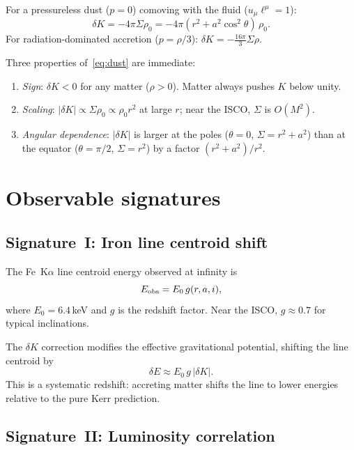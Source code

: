 \documentclass[12pt,a4paper]{article}
\begin{document}
\noindent
For a pressureless dust ($p=0$) comoving with the fluid
($u_\mu\ell^\mu=1$):
\begin{equation}\label{eq:dust}
  \delta K = -4\pi\Sigma\rho_0 = -4\pi(r^2+a^2\cos^2\!\theta)\,\rho_0.
\end{equation}
For radiation-dominated accretion ($p=\rho/3$):
$\delta K = -\tfrac{16\pi}{3}\Sigma\rho$.

Three properties of~\eqref{eq:dust} are immediate:
\begin{enumerate}
\item \emph{Sign}: $\delta K<0$ for any matter ($\rho>0$).
  Matter always pushes $K$ below unity.
\item \emph{Scaling}: $|\delta K|\propto\Sigma\rho_0\propto\rho_0 r^2$
  at large $r$; near the ISCO, $\Sigma$ is $O(M^2)$.
\item \emph{Angular dependence}: $|\delta K|$ is larger at the
  poles ($\theta=0$, $\Sigma=r^2+a^2$) than at the equator
  ($\theta=\pi/2$, $\Sigma=r^2$) by a factor $(r^2+a^2)/r^2$.
\end{enumerate}

\section{Observable signatures}\label{sec:obs}

\subsection{Signature~I: Iron line centroid shift}

The Fe~K$\alpha$ line centroid energy observed at infinity is
\begin{equation}
  E_{\rm obs} = E_0\,g(r,a,i),
\end{equation}
where $E_0=6.4$\,keV and $g$ is the redshift factor.
Near the ISCO, $g\approx0.7$ for typical inclinations.

The $\delta K$ correction modifies the effective gravitational
potential, shifting the line centroid by
\begin{equation}\label{eq:deltaE}
  \delta E \approx E_0\,g\,|\delta K|.
\end{equation}
This is a systematic redshift: accreting matter shifts the
line to lower energies relative to the pure Kerr prediction.

\subsection{Signature~II: Luminosity correlation}
\end{document}
